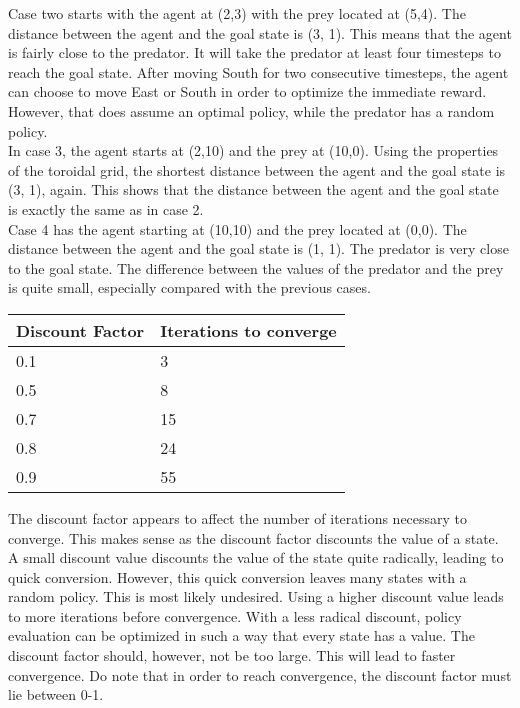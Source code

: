 \documentclass{article}
\begin{document}
Case two starts with the agent at (2,3) with the prey located at (5,4). The distance between the agent and the goal state is (3, 1). This means that the agent is fairly close to the predator. It will take the predator at least four timesteps to reach the goal state. After moving South for two consecutive timesteps, the agent can choose to move East or South in order to optimize the immediate reward. However, that does assume an optimal policy, while the predator has a random policy. \\

In case 3, the agent starts at (2,10) and the prey at (10,0). Using the properties of the toroidal grid, the shortest distance between the agent and the goal state is (3, 1), again. This shows that the distance between the agent and the goal state is exactly the same as in case 2. \\ 

Case 4 has the agent starting at (10,10) and the prey located at (0,0). The distance between the agent and the goal state is (1, 1). The predator is very close to the goal state. The difference between the values of the predator and the prey is quite small, especially compared with the previous cases.  \\



\begin{center}
	\begin{tabular}{ l || l }
		Discount Factor & Iterations to converge \\ 
		\hline
		0.1 & 3 \\
		0.5 & 8 \\
		0.7 & 15 \\
		0.8 & 24 \\
		0.9 & 55 \\	
	\end{tabular}
\end{center}

The discount factor appears to affect the number of iterations necessary to converge. This makes sense as the discount factor discounts the value of a state. A small discount value discounts the value of the state quite radically, leading to quick conversion. However, this quick conversion leaves many states with a random policy. This is most likely undesired. Using a higher discount value leads to more iterations before convergence. With a less radical discount, policy evaluation can be optimized in such a way that every state has a value. The discount factor should, however, not be too large. This will lead to faster convergence. Do note that in order to reach convergence, the discount factor must lie between 0-1.
\end{document}

